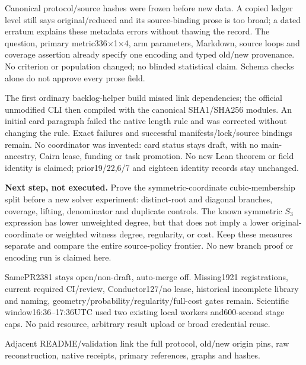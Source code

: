 \documentclass[11pt]{article}
\begin{document}
Canonical protocol/source hashes were frozen before new data. A copied ledger
level still says original/reduced and its source-binding prose is too broad;
a dated erratum explains these metadata errors without thawing the record.
The question, primary metric336$\times$1$\times$4, arm parameters, Markdown,
source loops and coverage assertion already specify one encoding and typed
old/new provenance. No criterion or population changed; no blinded statistical
claim. Schema checks alone do not approve every prose field.

The first ordinary backlog-helper build missed link dependencies; the official
unmodified CLI then compiled with the canonical SHA1/SHA256 modules. An initial
card paragraph failed the native length rule and was corrected without changing
the rule. Exact failures and successful manifests/lock/source bindings remain.
No coordinator was invented: card status stays draft, with no main-ancestry,
Cairn lease, funding or task promotion. No new Lean theorem or field identity
is claimed; prior19/22,6/7 and eighteen identity records stay unchanged.

\textbf{Next step, not executed.} Prove the symmetric-coordinate cubic-membership
split before a new solver experiment: distinct-root and diagonal branches,
coverage, lifting, denominator and duplicate controls. The known symmetric
$S_3$ expression has lower unweighted degree, but that does not imply a lower
original-coordinate or weighted witness degree, regularity, or cost. Keep
these measures separate and compare the entire source-policy frontier. No new
branch proof or encoding run is claimed here.

SamePR2381 stays open/non-draft, auto-merge off. Missing1921 registrations,
current required CI/review, Conductor127/no lease, historical incomplete library
and naming, geometry/probability/regularity/full-cost gates remain. Scientific
window16:36--17:36UTC used two existing local workers and600-second stage caps.
No paid resource, arbitrary result upload or broad credential reuse.

\small Adjacent README/validation link the full protocol, old/new origin pins,
raw reconstruction, native receipts, primary references, graphs and hashes.
\end{document}
